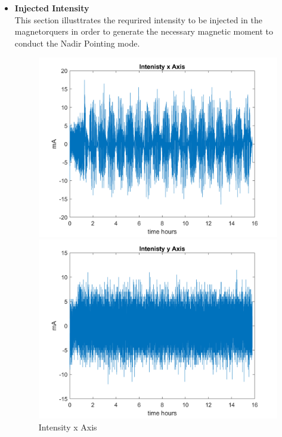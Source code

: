 \begin{itemize}
    \item \textbf{Injected Intensity}\\
    This section illusttrates the requrired intensity to be injected in the magnetorquers in order to generate the necessary
    magnetic moment to conduct the Nadir Pointing mode. 
    \begin{figure}[H]
        \centering
        \begin{minipage}{0.32\linewidth}
            \centering
            \includegraphics[width=0.95\linewidth]{res/img/Nadir_EKF/Simulations/Intenisty x Axis.png}
            \caption{Intensity x Axis}
            \label{fig:IntensityX}
        \end{minipage}\hfill
        \begin{minipage}{0.32\linewidth}
            \centering
            \includegraphics[width=0.95\linewidth]{res/img/Nadir_EKF/Simulations/Intenisty y Axis.png}

\end{minipage}
\end{figure}
\end{itemize}

